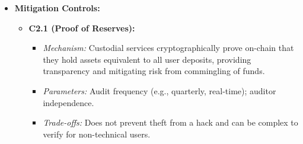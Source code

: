 \begin{itemize}
    \item \textbf{Mitigation Controls:}
        \begin{itemize}
            \item \textbf{C2.1 (Proof of Reserves):}
                \begin{itemize}
                    \item \textit{Mechanism:} Custodial services cryptographically prove on-chain that they hold assets equivalent to all user deposits, providing transparency and mitigating risk from commingling of funds.
                    \item \textit{Parameters:} Audit frequency (e.g., quarterly, real-time); auditor independence.
                    \item \textit{Trade-offs:} Does not prevent theft from a hack and can be complex to verify for non-technical users.
                \end{itemize}
        \end{itemize}
\end{itemize}

